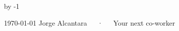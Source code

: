 \documentclass[11pt, a4paper]{awesome-cv}
\newcommand{\jobType}{product}
\begin{document}
\makecvheader[C]

\advance\day by -1

\makecvfooter
  {\today}
  {Jorge Alcantara~~~·~~~Your next co-worker}
  {\thepage}


%


\pagebreak


\end{document}
